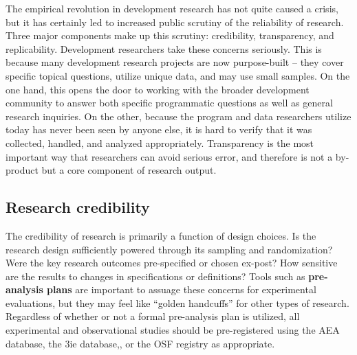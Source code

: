 The empirical revolution in development research has not quite caused a crisis,
but it has certainly led to increased public scrutiny of the reliability of research.\cite{rogers_2017}
Three major components make up this scrutiny: credibility,\cite{ioannidis2017power} transparency,\cite{christensen2018transparency} and replicability.\cite{duvendack2017meant}
Development researchers take these concerns seriously.
This is because many development research projects are now purpose-built --
they cover specific topical questions, utilize unique data, and may use small samples.
On the one hand, this opens the door to working with the broader development community
to answer both specific programmatic questions as well as general research inquiries.
On the other, because the program and data researchers utilize today has never been seen by anyone else,
it is hard to verify that it was collected, handled, and analyzed appropriately.
Transparency is the most important way that researchers can avoid serious error,
and therefore is not a by-product but a core component of research output.

\subsection{Research credibility}

The credibility of research is primarily a function of design choices.\cite{ioannidis2005most}
Is the research design sufficiently powered through its sampling and randomization?
Were the key research outcomes pre-specified or chosen ex-post?
How sensitive are the results to changes in specifications or definitions?
Tools such as \textbf{pre-analysis plans} are important to assuage these concerns for experimental evaluations,
but they may feel like ``golden handcuffs'' for other types of research.\cite{olken2015promises}
Regardless of whether or not a formal pre-analysis plan is utilized,
all experimental and observational studies should be pre-registered using the AEA database, the 3ie database,, or the OSF registry as appropriate.

